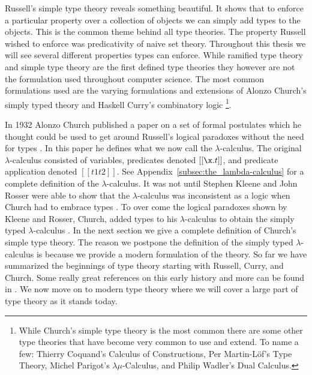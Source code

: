 Russell's simple type theory reveals something beautiful.  It shows
that to enforce a particular property over a collection of objects we
can simply add types to the objects.  This is the common theme behind
all type theories.  The property Russell wished to enforce was
predicativity of naive set theory.  Throughout this thesis we will see
several different properties types can enforce.  While ramified type
theory and simple type theory are the first defined type theories they
however are not the formulation used throughout computer science.  The
most common formulations used are the varying formulations and
extensions of Alonzo Church's simply typed theory and Haskell Curry's
combinatory logic \cite{Church:1940,Cardone:2006} 
\footnote{While Church's simple type theory is the most common there
  are some other type theories that have become very common to use and
  extend.  To name a few: Thierry Coquand's Calculus of Constructions,
  Per Martin-L\"of's Type Theory, Michel Parigot's
  $\lambda\mu$-Calculus, and Philip Wadler's Dual Calculus.}.  

In 1932 Alonzo Church published a paper on a set of formal postulates
which he thought could be used to get around Russell's logical
paradoxes without the need for types \cite{Church:1933}.  In this
paper he defines what we now call the $\lambda$-calculus.  The
original $\lambda$-calculus consisted of variables, predicates denoted
$[[\x.t]]$, and predicate application denoted $[[t1 t2]]$.  See
Appendix~\ref{subsec:the_lambda-calculus} for a complete definition of
the $\lambda$-calculus.  It was not until Stephen Kleene and John Rosser were
able to show that the $\lambda$-calculus was inconsistent as a logic
when Church had to embrace types \cite{Kleene:1935}.  To over come the
logical paradoxes shown by Kleene and Rosser, Church, added types to
his $\lambda$-calculus to obtain the simply typed $\lambda$-calculus
\cite{Church:1940,Andrews:2009}.  In the next section we give a
complete definition of Church's simple type theory.  The reason we
postpone the definition of the simply typed $\lambda$-calculus is
because we provide a modern formulation of the theory.  So far we have
summarized the beginnings of type theory starting with Russell, Curry,
and Church.  Some really great references on this early history and more
can be found in \cite{Cardone:2006,Coquand:2010b,Barendregt:1992}.  We now
move on to modern type theory where we will cover a large part of type
theory as it stands today.

